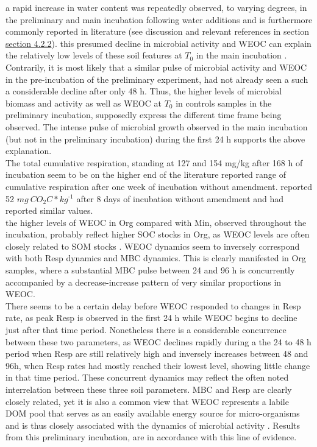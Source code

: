 \documentclass[12pt]{report}
\newlength{\SpaceAfterUnit}
\newcommand{\cumrespunit}{$ mg\ CO_2$\text{-}$C * kg^{\text{-}1}$ \hspace*{\SpaceAfterUnit}}
\begin{document}
a rapid increase in water content was repeatedly observed, to varying degrees, in the preliminary and main incubation following water additions and is furthermore commonly reported in literature (see discussion and relevant references in section \hyperref[subsection_4.2.2]{section 4.2.2}). this presumed decline in microbial activity and WEOC can explain the relatively low levels of these soil features at $ T_0 $ in the main incubation . Contrarily, it is most likely that a similar pulse of microbial activity and WEOC in the pre-incubation of the preliminary experiment, had not already seen a such a considerable decline after only 48 h. Thus, the higher levels of microbial biomass and activity as well as WEOC at $ T_0 $ in controls samples in the preliminary incubation, supposedly express the different time frame being observed. The intense pulse of microbial growth observed in the main incubation (but not in the preliminary incubation) during the first 24 h supports the above explanation.\\
The total cumulative respiration, standing at 127 and 154 mg/kg after 168 h of incubation seem to be on the higher end of the literature reported range of cumulative respiration after one week of incubation without amendment. \citet{ribeiro2010} reported 52 \cumrespunit after 8 days of incubation without amendment and \citet{kemmitt2008} had reported similar values. \\ 	
the higher levels of WEOC in Org compared with Min, observed throughout the incubation, probably reflect higher SOC stocks in Org, as WEOC levels are often closely related to SOM stocks\citep{malik2013} . WEOC dynamics seem to inversely correspond with both Resp dynamics and MBC dynamics. This is clearly manifested in Org samples, where a substantial MBC pulse between 24 and 96 h is concurrently accompanied by a decrease-increase pattern of very similar proportions in WEOC.\\
There seems to be a certain delay before WEOC responded to changes in Resp rate, as peak Resp is observed in the first 24 h while WEOC begins to decline just after that time period. Nonetheless there is a considerable concurrence between these two parameters, as WEOC declines rapidly during a the 24 to 48 h period when Resp are still relatively high and inversely increases between 48 and 96h, when Resp rates had mostly reached their lowest level, showing little change in that time period. These concurrent dynamics may reflect the often noted interrelation between these three soil parameters. MBC and Resp are clearly closely related, yet it is also a common view that WEOC represents a labile DOM pool that serves as an easily available energy source for micro-organisms and is thus closely associated with the dynamics of microbial activity \citep{kemmitt2008, kaiser2012, guggenberger1998}. Results from this preliminary incubation, are in accordance with this line of evidence.\\
\end{document}
